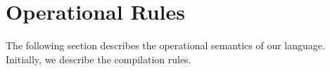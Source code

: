 
\section{Operational Rules}
The following section describes the operational semantics of our language. Initially, we describe
the compilation rules.







